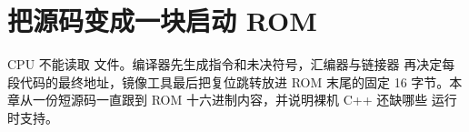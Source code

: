 \chapter{把源码变成一块启动 ROM}

CPU 不能读取  文件。编译器先生成指令和未决符号，汇编器与链接器
再决定每段代码的最终地址，镜像工具最后把复位跳转放进 ROM 末尾的固定 16
字节。本章从一份短源码一直跟到 ROM 十六进制内容，并说明裸机 C++ 还缺哪些
运行时支持。






